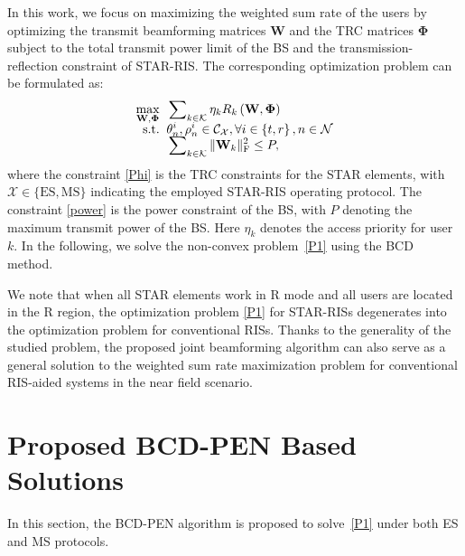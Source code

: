 \documentclass[12pt, draftclsnofoot, onecolumn]{IEEEtran}
\begin{document}
In this work, we focus on maximizing the weighted sum rate of the users by optimizing the  transmit beamforming matrices $\mathbf{W}$ and the TRC matrices $\mathbf{\Phi}$ subject to the total transmit power limit of the BS and the transmission-reflection constraint of STAR-RIS. The corresponding optimization problem can be formulated as:
\begin{subequations}\label{P1}
\begin{align}
\label{OBP1}\mathop {\max }\limits_{ {{\mathbf{W}},{\mathbf{\Phi}}} } \;\;&\sum\nolimits_{k\in\mathcal{K}}\eta_k R_k\left(\mathbf{W},\mathbf{\Phi}\right)\\[-0.2cm]
\label{Phi}{\rm{s.t.}}\;\;& {\theta}_n^i, {\rho}_n^i\in \mathcal{C}_{\mathcal{X}},\forall i \in \left\{ {t,r} \right\}, n \in \mathcal{N}\\[-0.2cm]
\label{power}&\sum\nolimits_{k\in\mathcal{K}}\|\mathbf{W}_k\|_{\text{F}}^{2}\le P,
\end{align}
\end{subequations}
where the constraint \eqref{Phi} is the TRC constraints for the STAR elements, with $\mathcal{X}\in\{\text{ES}, \text{MS}\}$ indicating the employed STAR-RIS operating protocol. The constraint \eqref{power} is the power constraint of the BS, with $P$ denoting the maximum transmit power of the BS. Here $\eta_k$ denotes the access priority for user $k$. In the following, we solve the non-convex problem~\eqref{P1} using the BCD method.

We note that when all STAR elements work in R mode and all users are located in the R region, the optimization problem \eqref{P1} for STAR-RISs degenerates into the optimization problem for conventional RISs. Thanks to the generality of the studied problem, the proposed joint beamforming algorithm can also serve as a general solution to the weighted sum rate maximization problem for conventional RIS-aided systems in the near field scenario.
\section{Proposed BCD-PEN Based Solutions}
In this section, the BCD-PEN algorithm is proposed to solve~\eqref{P1} under both ES and MS protocols.\vspace{-0.4cm}
\end{document}
